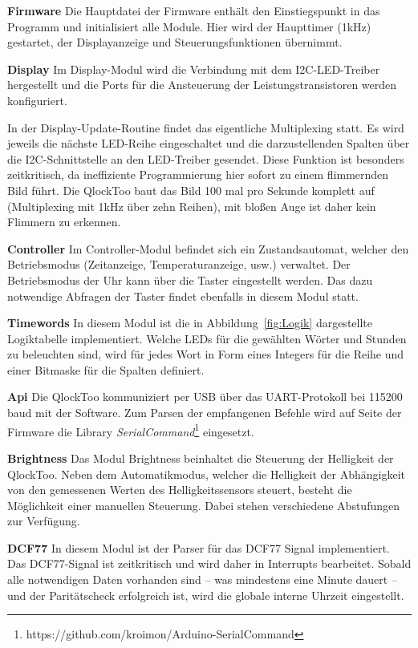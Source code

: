 \begin{multicols}{2}
\textbf{Firmware}
Die Hauptdatei der Firmware enthält den Einstiegspunkt in das Programm und initialisiert alle Module. Hier wird der Haupttimer (1kHz) gestartet, der Displayanzeige und Steuerungsfunktionen übernimmt.

\textbf{Display}
Im Display-Modul wird die Verbindung mit dem I2C-LED-Treiber hergestellt und die Ports für die Ansteuerung der Leistungstransistoren werden konfiguriert.

In der Display-Update-Routine findet das eigentliche Multiplexing statt. Es wird jeweils die nächste LED-Reihe eingeschaltet und die darzustellenden Spalten über die I2C-Schnittstelle an den LED-Treiber gesendet.
Diese Funktion ist besonders zeitkritisch, da ineffiziente Programmierung hier sofort zu einem flimmernden Bild führt.
Die QlockToo baut das Bild 100 mal pro Sekunde komplett auf (Multiplexing mit 1kHz über zehn Reihen), mit bloßen Auge ist daher kein Flimmern zu erkennen.

\textbf{Controller}
Im Controller-Modul befindet sich ein Zustandsautomat, welcher den Betriebsmodus (Zeitanzeige, Temperaturanzeige, usw.) verwaltet.
Der Betriebsmodus der Uhr kann über die Taster eingestellt werden. Das dazu notwendige Abfragen der Taster findet ebenfalls in diesem Modul statt.

\textbf{Timewords}
In diesem Modul ist die in Abbildung~\ref{fig:Logik} dargestellte Logiktabelle implementiert.
Welche LEDs für die gewählten Wörter und Stunden zu beleuchten sind, wird für jedes Wort in Form eines Integers für die Reihe und einer Bitmaske für die Spalten definiert.

\textbf{Api}
Die QlockToo kommuniziert per USB über das UART-Protokoll bei 115200 baud mit der Software.
Zum Parsen der empfangenen Befehle wird auf Seite der Firmware die Library \emph{SerialCommand}\footnote{https://github.com/kroimon/Arduino-SerialCommand} eingesetzt.

\textbf{Brightness}
Das Modul Brightness beinhaltet die Steuerung der Helligkeit der QlockToo. Neben dem Automatikmodus, welcher die Helligkeit der Abhängigkeit von den gemessenen Werten des Helligkeitssensors steuert, besteht die Möglichkeit einer manuellen Steuerung. Dabei stehen verschiedene Abstufungen zur Verfügung.

\textbf{DCF77}
In diesem Modul ist der Parser für das DCF77 Signal implementiert. Das DCF77-Signal ist zeitkritisch und wird daher in Interrupts bearbeitet.
Sobald alle notwendigen Daten vorhanden sind -- was mindestens eine Minute dauert -- und der Paritätscheck erfolgreich ist, wird die globale interne Uhrzeit eingestellt.


\end{multicols}
